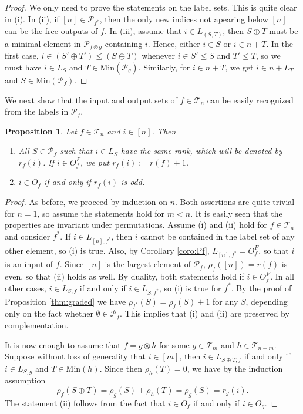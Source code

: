 \documentclass[12pt]{article}
\newtheorem{prop}{Proposition}
\theoremstyle{definition}
\theoremstyle{remark}
\def\Te{\mathcal T}
\def\Pe{\mathcal P}
\begin{document}
\begin{proof} We only need to prove the statements on the label sets. This is quite clear
in (i). In
(ii), if $[n]\in \Pe_{f^*}$, then the only new indices  not apearing below $[n]$ can be
the free outputs of $f$. In (iii), assume that $i\in L_{(S,T)}$, then $S\oplus T$ must be a minimal
element in $\Pe_{f\otimes g}$ containing $i$. Hence, either $i\in S$ or $i\in n+T$. In the
first case, $i\in (S'\oplus T')\le (S\oplus T)$ whenever  $i\in S'\le S$ and $T'\le T$, so we must have 
$i\in L_S$ and $T\in \mathrm{Min}(\Pe_g)$. Similarly, for $i\in n+T$, we get $i\in n+L_T$
and $S\in \mathrm{Min}(\Pe_f)$. 


\end{proof}



We next show that the input and output sets of $f\in \Te_n$ can be easily recognized from
the labels in $\Pe_f$. 

\begin{prop}\label{prop:pfinput} Let $f\in \Te_n$ and $i\in [n]$. Then
\begin{enumerate}
\item[(i)] All $S\in \Pe_f$ such that $i\in L_S$  have the same rank,  which will be
denoted by $r_f(i)$. If  $i\in O_f^F$,   we put $r_f(i):=r(f)+1$. 
\item [(ii)] $i\in O_f$ if and only if $r_f(i)$ is odd.

\end{enumerate}
\end{prop}



\begin{proof} As before, we proceed by induction on $n$. Both assertions are quite trivial for $n=1$,
so assume the statements hold for $m<n$. It is easily seen that the properties are
invariant under permutations. Assume (i) and (ii) hold for $f\in \Te_n$ and consider
$f^*$. If $i\in L_{[n],f^*}$, then $i$ cannot be contained in the label set of any other
element, so (i) is true. Also, by Corollary \ref{coro:Pf}, $L_{[n],f^*}=O_f^F$, so that
$i$ is an input of $f$. Since $[n]$ is the largest element of $\Pe_f$, 
$\rho_f([n])=r(f)$ is even, so that (ii) holds as well. By duality, both statements hold
if $i\in O_f^F$. In all other cases, $i\in L_{S,f}$ if and only if $i\in L_{S,f^*}$, so
(i) is true for $f^*$. By the
proof of Proposition \ref{thm:graded} we have  
$\rho_{f^*}(S)=\rho_f(S)\pm 1$ for any $S$, depending only on the fact whether $\emptyset
\in \Pe_f$. This implies that (i) and (ii)  are preserved by complementation.

 It is now enough to assume that
$f=g\otimes h$ for some $g\in \Te_m$ and $h\in \Te_{n-m}$. 
Suppose without loss of generality that $i\in [m]$, then $i\in L_{S\oplus T, f}$ if and
only if $i\in L_{S,g}$ and $T\in \mathrm{Min}(h)$.  Since then $\rho_h(T)=0$, we have
by the induction assumption
\[
\rho_f(S\oplus T)=\rho_g(S)+\rho_h(T)=\rho_g(S)= r_g(i).
\]
The statement (ii) follows from the fact that $i\in O_f$ if and only if $i\in O_g$.


\end{proof}
\end{document}
